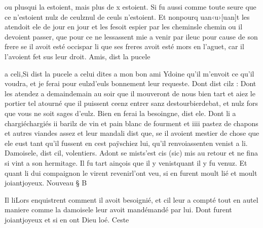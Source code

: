 \documentclass{article}
\begin{document}
\begin{pages}
                        ou plusqui la estoient, mais plus de x estoient. Si fu aussi comme toute seure que 
                  ce n’estoient nulz de ceulznul de ceuls n'estoient. Et nonpourq
                  uan‹u›[uan]t les atendoit ele de jour en jour et les fesoit espier par 
                  les cheminsle chemin ou il devoient passer, que pour ce ne lessassent mie a venir 
                  par ileuc pour cause de son
                        frere se il avoit esté occispar li que ses freres avoit esté mors en l’aguet, car il l’avoient fet sus leur droit. 
                     Amis, dist la pucele
                        
                           a celi,Si dist la pucele a celui dites 
                     a mon bon ami Ydoine qu’il m’envoit ce
                  qu’il voudra, et je ferai 
                     pour eulzd'euls bonnement leur requeste. Dont dist cilz : Dont les atendez a 
                     demaindemain au soir que il mouveront de nous bien tart et aiez le portier tel 
                     atourné que il puissent ceenz entrer sanz 
                     destourbierdebat, et nulz fors que vous ne soit sages d’eulz.
               Bien en ferai la besoingne, dist ele. Dont li
               a 
                  chargiéchargiés
               ii barilz de vin et pain blanc de fourment et iiii pastez de
               chapons et autres viandes assez et 
                  leur mandali dist que, se il avoient mestier de chose que ele
                  eust tant qu’il fussent 
                     en cest paÿschiez lui, qu’il 
                     renvoiassenten venist a li. Damoisele, dist cil,
                  volentiers. Adont 
                  se mists'est cis (sic) mis au retour et ne fina si vint a son
                  hermitage. Il fu tart 
                  ainçois que il y venistquant il y fu venuz. Et quant li dui compaignon 
                  le virent revenirl'ont veu, si en furent moult lié et moult 
                  joiantjoyeux. Nouveau § B

                  Il liLors enquistrent comment il avoit
                  besoignié, et cil leur a compté tout en
                  autel maniere comme la damoisele leur avoit 
                     mandémandé par lui. Dont furent 
                  joiantjoyeux et si en ont Dieu loé. Ceste 
                  

\end{pages}
\end{document}
